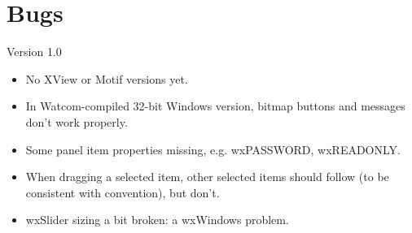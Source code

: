 \chapter{Bugs}\label{bugs}
%
\setfooter{\thepage}{}{}{}{}{\thepage}%

Version 1.0

\begin{itemize}\itemsep=0pt
\item No XView or Motif versions yet.
\item In Watcom-compiled 32-bit Windows version, bitmap buttons and messages
don't work properly.
\item Some panel item properties missing, e.g. wxPASSWORD, wxREADONLY.
\item When dragging a selected item, other selected items should follow (to be
consistent with convention), but don't.
\item wxSlider sizing a bit broken: a wxWindows problem.
\end{itemize}
